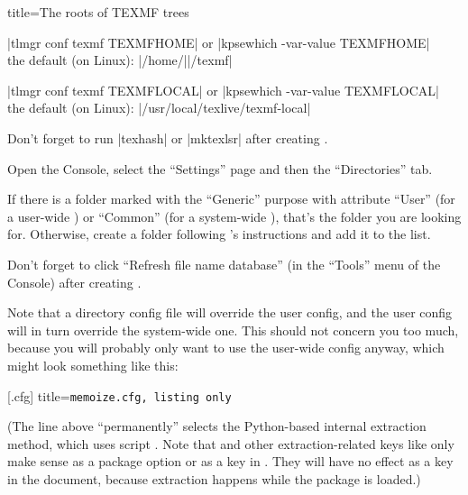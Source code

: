 \documentclass[a4paper,11pt]{article}
\begin{document}
\begin{tcboxedraster}
  [raster columns=1, raster valign=top, raster force size=false]
  {title=The roots of TEXMF trees}
\begin{tcolorbox}[title={\TeXLive[white]\hfill\url[white](https://){tug.org/texlive}}]
  \begin{description}[itemsep=0pt]
  \item[user-wide]
    |tlmgr conf texmf TEXMFHOME|
    or |kpsewhich -var-value TEXMFHOME|\\
    the default (on Linux): |/home/||/texmf|
  \item[system-wide]
    |tlmgr conf texmf TEXMFLOCAL|
    or |kpsewhich -var-value TEXMFLOCAL|\\
    the default (on Linux): |/usr/local/texlive/texmf-local|
  \end{description}

  \smallskip
  Don't forget to run |texhash| or |mktexlsr| after creating .
\end{tcolorbox}
\begin{tcolorbox}[title={\MiKTeX[white]\hfill\url[white](https://){miktex.org}},
    before upper={\parskip0.3\baselineskip plus 2pt\relax},]
  Open the \MiKTeX Console, select the ``Settings'' page and then the
  ``Directories'' tab.

  If there is a folder marked with the ``Generic'' purpose with attribute
  ``User'' (for a user-wide ) or ``Common'' (for a system-wide
    ), that's the folder you are looking for.  Otherwise, create a
  folder following \MiKTeX's instructions and add it to the list.
  
  Don't forget to click ``Refresh file name database'' (in the ``Tools'' menu
    of the \MiKTeX Console) after creating .
\end{tcolorbox}
\end{tcboxedraster}

Note that a directory config file will override the user config, and the user
config will in turn override the system-wide one.  This should not concern you
too much, because you will probably only want to use the user-wide config
anyway, which might look something like this:

[.cfg]{
  title=\tt memoize.cfg,
  listing only
}

(The  line above ``permanently'' selects the Python-based
internal extraction method, which uses script .
Note that  and other extraction-related keys like  only make sense as a package option or as a
 key in .  They will have no effect as a
 key in the document, because extraction happens while the
package is loaded.)
\end{document}
